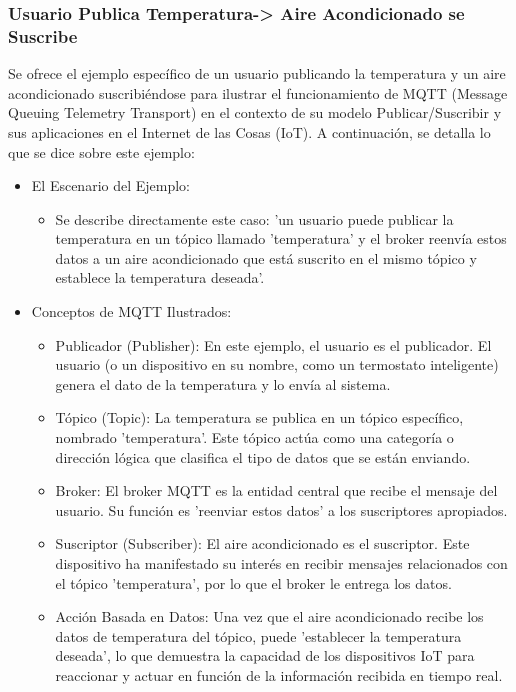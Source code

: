 \documentclass{report}
\begin{document}
\subsubsection{Usuario Publica Temperatura-> Aire Acondicionado se Suscribe}
Se ofrece el ejemplo específico de un usuario publicando la temperatura y un aire acondicionado 
suscribiéndose para ilustrar el funcionamiento de MQTT (Message Queuing Telemetry Transport) en el contexto de su modelo Publicar/Suscribir 
y sus aplicaciones en el Internet de las Cosas (IoT).
A continuación, se detalla lo que se  dice sobre este ejemplo:
\begin{itemize}
    \item El Escenario del Ejemplo:
        \begin{itemize}
            \item Se describe directamente este caso: 'un usuario puede publicar la temperatura en un tópico llamado 
            'temperatura' y el broker reenvía estos datos a un aire acondicionado que está suscrito en el mismo tópico y establece 
            la temperatura deseada'.        
        \end{itemize}
            
    \item Conceptos de MQTT Ilustrados:
        \begin{itemize}
            \item Publicador (Publisher): En este ejemplo, el usuario es el publicador. El usuario (o un dispositivo en su nombre, como un 
            termostato inteligente) genera el dato de la temperatura y lo envía al sistema.
            \item Tópico (Topic): La temperatura se publica en un tópico específico, nombrado 'temperatura'. Este tópico actúa como una categoría 
            o dirección lógica que clasifica el tipo de datos que se están enviando.
            \item Broker: El broker MQTT es la entidad central que recibe el mensaje del usuario. Su función es 'reenviar estos datos' a los 
            suscriptores apropiados.
            \item Suscriptor (Subscriber): El aire acondicionado es el suscriptor. Este dispositivo ha manifestado su interés en recibir mensajes 
            relacionados con el tópico 'temperatura', por lo que el broker le entrega los datos.
            \item Acción Basada en Datos: Una vez que el aire acondicionado recibe los datos de temperatura del tópico, puede 'establecer la 
            temperatura deseada', lo que demuestra la capacidad de los dispositivos IoT para reaccionar y actuar en función de la información 
            recibida en tiempo real.
        \end{itemize}


\end{itemize}
\end{document}
